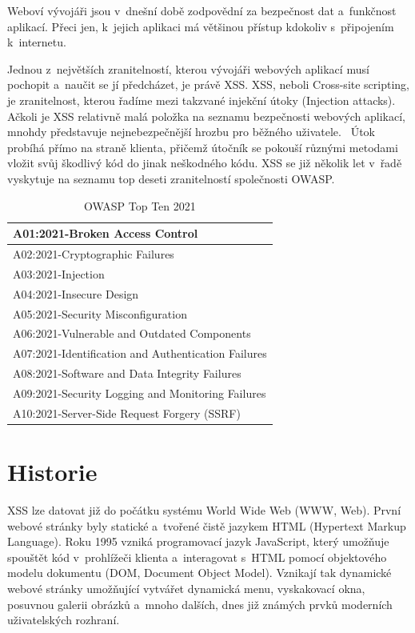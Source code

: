 \documentclass[11pt, conference, a4paper]{IEEEtran}
\begin{document}
Weboví vývojáři jsou v~dnešní době zodpovědní za bezpečnost dat a~funkčnost aplikací. Přeci jen, k~jejich aplikaci má většinou přístup kdokoliv s~připojením k~internetu.

Jednou z~největších zranitelností, kterou vývojáři webových aplikací musí pochopit a~naučit se jí předcházet, je právě XSS. XSS, neboli Cross-site scripting, je zranitelnost, kterou řadíme mezi takzvané injekční útoky (Injection attacks). Ačkoli je XSS relativně malá položka na seznamu bezpečnosti webových aplikací, mnohdy představuje nejnebezpečnější hrozbu pro běžného uživatele.~\cite{Grossman2007} Útok probíhá přímo na straně klienta, přičemž útočník se pokouší různými metodami vložit svůj škodlivý kód do jinak neškodného kódu. XSS se již několik let v~řadě vyskytuje na seznamu top deseti zranitelností společnosti OWASP.



\begin{table}[ht]
    \caption{OWASP Top Ten 2021 \cite{owasp-topten}}
    \label{tab:owasptop10}
    \centering
    \begin{tabular}{|l|}
        \hline
        A01:2021-Broken Access Control\\
        \hline
        A02:2021-Cryptographic Failures\\
        \hline
        A03:2021-Injection\\
        \hline
        A04:2021-Insecure Design\\
        \hline
        A05:2021-Security Misconfiguration\\
        \hline
        A06:2021-Vulnerable and Outdated Components\\
        \hline
        A07:2021-Identification and Authentication Failures\\
        \hline
        A08:2021-Software and Data Integrity Failures\\
        \hline
        A09:2021-Security Logging and Monitoring Failures\\
        \hline
        A10:2021-Server-Side Request Forgery (SSRF)\\
        \hline
    \end{tabular}
    
\end{table}

\section{Historie}
XSS lze datovat již do počátku systému World Wide Web (WWW, Web). První webové stránky byly statické a~tvořené čistě jazykem HTML (Hypertext Markup Language). Roku 1995 vzniká programovací jazyk JavaScript, který umožňuje spouštět kód v~prohlížeči klienta a~interagovat s~HTML pomocí objektového modelu dokumentu (DOM,  Document Object Model). Vznikají tak dynamické webové stránky umožňující vytvářet dynamická menu, vyskakovací okna, posuvnou galerii obrázků a~mnoho dalších, dnes již známých prvků moderních uživatelských rozhraní. 
\end{document}
